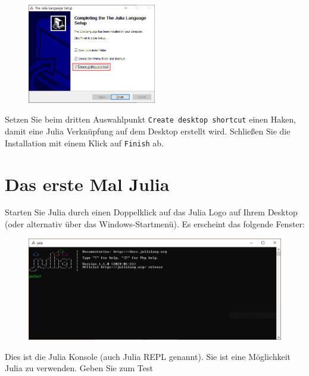 \documentclass[11pt, a4paper]{scrartcl}
\begin{document}
	\begin{figure}[h!]
	\centering
	\includegraphics[width=0.5\textwidth]{imgs/install_finish.png}
	\end{figure}

	Setzen Sie beim dritten Auswahlpunkt \texttt{Create desktop shortcut} einen Haken, damit eine Julia Verknüpfung auf dem Desktop erstellt wird. Schließen Sie die Installation mit einem Klick auf \texttt{Finish} ab.
	
	
	
	
	
	
	
	
	
	
	
	
	
	
	
	
	\newpage
	\section{Das erste Mal Julia}
	Starten Sie Julia durch einen Doppelklick auf das Julia Logo auf Ihrem Desktop (oder alternativ über das Windows-Startmenü). Es erscheint das folgende Fenster:
	
	\begin{figure}[h!]
	\centering
	\includegraphics[width=\textwidth]{imgs/julia_REPL.png}
	\end{figure}

	Dies ist die Julia Konsole (auch Julia REPL genannt). Sie ist eine Möglichkeit Julia zu verwenden. Geben Sie zum Test
	
\end{document}
